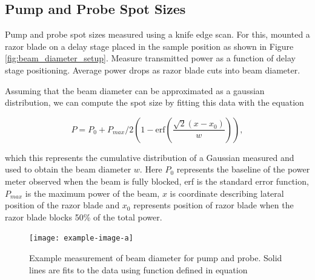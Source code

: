 \subsection{Pump and Probe Spot Sizes}
Pump and probe spot sizes measured using a knife edge scan. For this, mounted a razor blade on a delay stage placed in the sample position as shown in Figure \ref{fig:beam_diameter_setup}. Measure transmitted power as a function of delay stage positioning. Average power drops as razor blade cuts into beam diameter. 

Assuming that the beam diameter can be approximated as a gaussian distribution, we can compute the spot size by fitting this data with the equation 

\begin{equation}
	P = P_0 + P_{max}/2 \left( 1 - \mathrm{erf} \left( \dfrac{\sqrt{2}(x - x_0)}{w} \right) \right),
\end{equation}

which this represents the cumulative distribution of a Gaussian measured and used to obtain the beam diameter $w$. Here $P_0$ represents the baseline of the power meter observed when the beam is fully blocked, erf is the standard error function, $P_{max}$ is the maximum power of the beam, $x$ is coordinate describing lateral position of the razor blade and $x_0$ represents position of razor blade when the razor blade blocks 50\% of the total power.  



\begin{figure}[h]
	\centering
	\texttt{[image: example-image-a]}
	\caption{Example measurement of beam diameter for pump and probe. Solid lines are fits to the data using function defined in equation}
		\label{fig:beam_diamter_measurement}
\end{figure}



